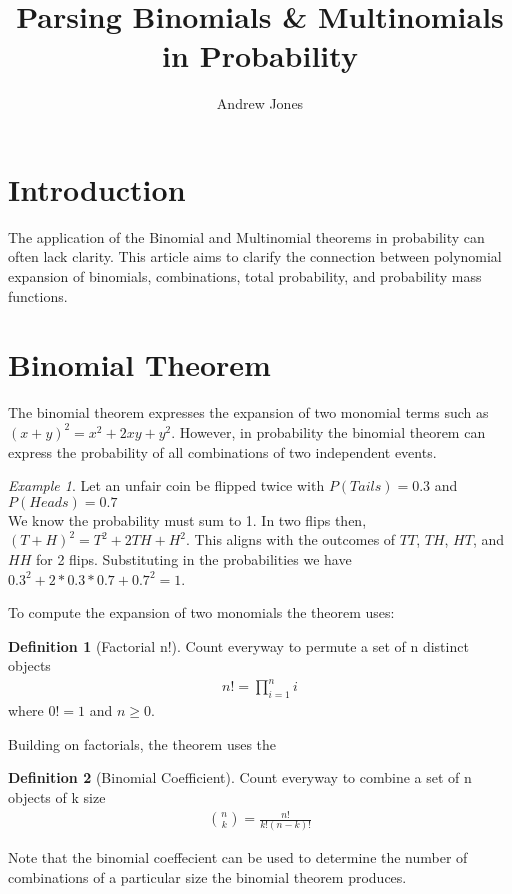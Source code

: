 \documentclass{article}
\title{Parsing Binomials \& Multinomials in Probability}
\author{Andrew Jones}\date{}
\theoremstyle{plain}
\theoremstyle{definition}
\newtheorem{definition}{Definition}
\theoremstyle{remark}
\newtheorem{example}{Example}
\begin{document}
\maketitle



\section*{Introduction}

The application of the Binomial and Multinomial theorems in probability can often lack clarity. This article aims to clarify the connection between polynomial expansion of binomials, combinations, total probability, and probability mass functions.


\section{Binomial Theorem}
The binomial theorem expresses the expansion of two monomial terms such as $(x + y)^2 = x^2 + 2xy + y^2$. However, in probability the binomial theorem can express the probability of all combinations of two independent events.
\begin{example}
  Let an unfair coin be flipped twice with $P(Tails) = 0.3$ and $P(Heads) = 0.7$ \\
  We know the probability must sum to 1. In two flips then, $(T + H)^2 = T^2 + 2TH + H^2$. This aligns with the outcomes of $TT$, $TH$, $HT$, and $HH$ for 2 flips. Substituting in the probabilities we have $0.3^2 + 2*0.3*0.7 + 0.7^2 = 1$.
\end{example}
To compute the expansion of two monomials the theorem uses:
\begin{definition}[Factorial n!]
  Count everyway to permute a set of n distinct objects
  \begin{align*}
    n! = {\displaystyle\prod_{i=1}^{n}i}
  \end{align*}
  where $0! = 1$ and $n \geq 0$.
\end{definition}
Building on factorials, the theorem uses the
\begin{definition}[Binomial Coefficient]
  Count everyway to combine a set of n objects of k size
  \begin{align*}
    \binom{n}{k} = \frac{n!}{k!(n-k)!}
  \end{align*}
\end{definition}
Note that the binomial coeffecient can be used to determine the number of combinations of a particular size the binomial theorem produces.
\end{document}
